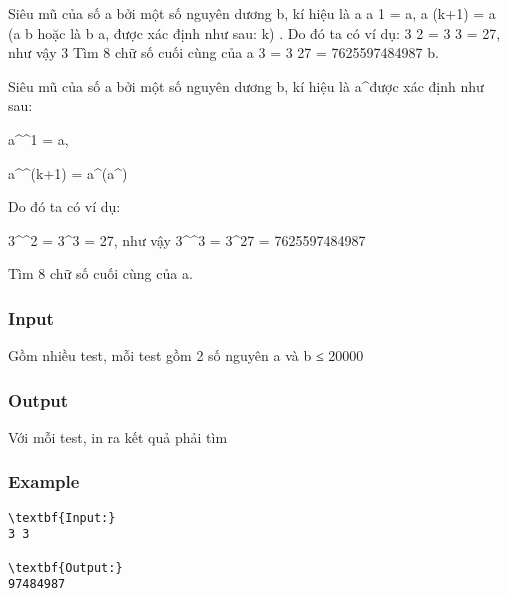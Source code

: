 



     Siêu mũ của số a bởi một số nguyên dương b, kí hiệu là a       a 1 = a,       a (k+1) = a (a       b hoặc là b a, được xác định như sau:       k)       .       Do đó ta có ví dụ: 3       2 = 3 3 = 27, như vậy 3       Tìm 8 chữ số cuối cùng của a       3 = 3 27 = 7625597484987       b.    

   Siêu mũ của số a bởi một số nguyên dương b, kí hiệu là a\textasciicircum\textasciicircumb được xác định như sau:  

   a\textasciicircum\textasciicircum1 = a,  

   a\textasciicircum\textasciicircum(k+1) = a\textasciicircum(a\textasciicircum\textasciicircumk)  

   Do đó ta có ví dụ:  

   3\textasciicircum\textasciicircum2 = 3\textasciicircum3 = 27, như vậy 3\textasciicircum\textasciicircum3 = 3\textasciicircum27 = 7625597484987  

   Tìm 8 chữ số cuối cùng của a.  



\subsubsection{   Input  }

   Gồm nhiều test, mỗi test gồm 2 số nguyên a và b ≤ 20000  

\subsubsection{   Output  }

   Với mỗi test, in ra kết quả phải tìm  

\subsubsection{   Example  }
\begin{verbatim}
\textbf{Input:}
3 3

\textbf{Output:}
97484987
\end{verbatim}